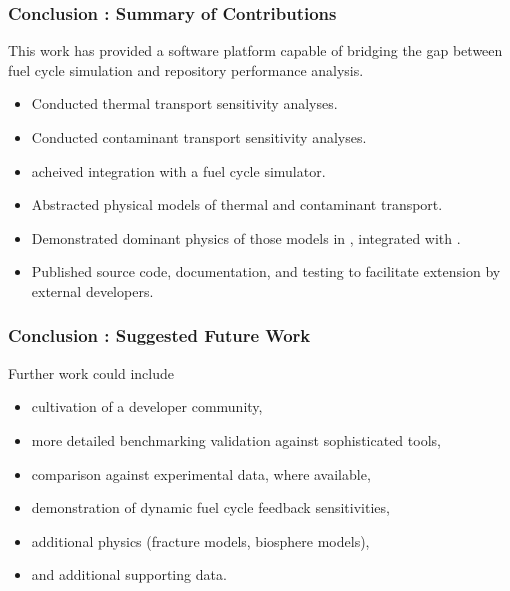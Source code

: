 
\begin{frame}[ctb!]
\frametitle{Conclusion : Summary of Contributions}

This work has provided a software platform capable of bridging the gap between
fuel cycle simulation and repository performance analysis.

  \begin{itemize}
  \item Conducted thermal transport sensitivity analyses. \cite{huff_numerical_2012, huff_benchmarking_2012}
  \item Conducted contaminant transport sensitivity analyses. \cite{huff_key_2012}
  \item \Cyder acheived integration with a fuel cycle simulator.
  \item Abstracted physical models of thermal and contaminant transport. \cite{huff_hydrologic_2013}
  \item Demonstrated dominant physics of those models in \Cyder, integrated 
  with \Cyclus. \cite{huff_dynamic_2013, huff_cyclus_2013}
  \item Published source code, documentation, and testing to facilitate 
  extension by external developers. \cite{huff_cyder_2013}
  \end{itemize}
\end{frame}

\begin{frame}[ctb!]
  \frametitle{Conclusion : Suggested Future Work}
  Further work could include
  \begin{itemize}
  \item cultivation of a developer community,
  \item more detailed benchmarking validation against sophisticated tools,
  \item comparison against experimental data, where available,
  \item demonstration of dynamic fuel cycle feedback sensitivities,
  \item additional physics (fracture models, biosphere models),
  \item and additional supporting data.
  \end{itemize}
\end{frame}

